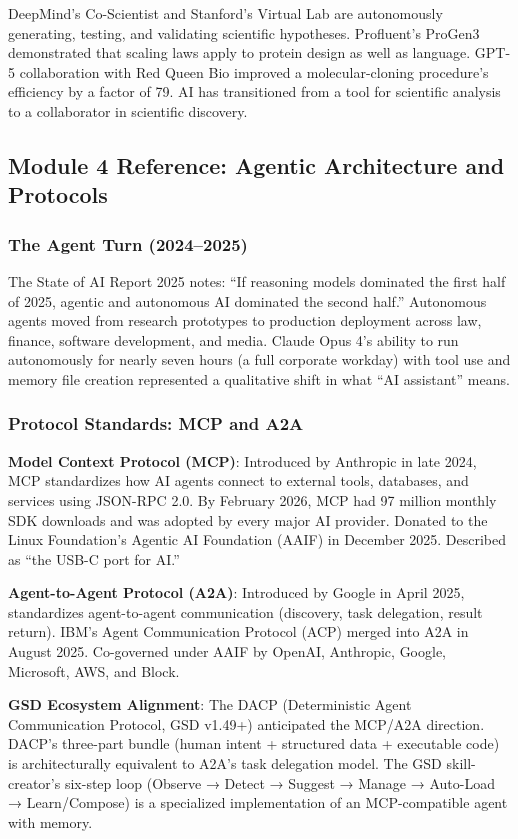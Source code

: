 \documentclass[11pt,letterpaper]{article}
\begin{document}
DeepMind's Co-Scientist and Stanford's Virtual Lab are autonomously generating, testing, and validating scientific hypotheses. Profluent's ProGen3 demonstrated that scaling laws apply to protein design as well as language. GPT-5 collaboration with Red Queen Bio improved a molecular-cloning procedure's efficiency by a factor of 79. AI has transitioned from a tool for scientific analysis to a collaborator in scientific discovery.

\subsection{Module 4 Reference: Agentic Architecture and Protocols}

\subsubsection{The Agent Turn (2024--2025)}

The State of AI Report 2025 notes: ``If reasoning models dominated the first half of 2025, agentic and autonomous AI dominated the second half.'' Autonomous agents moved from research prototypes to production deployment across law, finance, software development, and media. Claude Opus 4's ability to run autonomously for nearly seven hours (a full corporate workday) with tool use and memory file creation represented a qualitative shift in what ``AI assistant'' means.

\subsubsection{Protocol Standards: MCP and A2A}

\textbf{Model Context Protocol (MCP)}: Introduced by Anthropic in late 2024, MCP standardizes how AI agents connect to external tools, databases, and services using JSON-RPC 2.0. By February 2026, MCP had 97 million monthly SDK downloads and was adopted by every major AI provider. Donated to the Linux Foundation's Agentic AI Foundation (AAIF) in December 2025. Described as ``the USB-C port for AI.''

\textbf{Agent-to-Agent Protocol (A2A)}: Introduced by Google in April 2025, standardizes agent-to-agent communication (discovery, task delegation, result return). IBM's Agent Communication Protocol (ACP) merged into A2A in August 2025. Co-governed under AAIF by OpenAI, Anthropic, Google, Microsoft, AWS, and Block.

\textbf{GSD Ecosystem Alignment}: The DACP (Deterministic Agent Communication Protocol, GSD v1.49+) anticipated the MCP/A2A direction. DACP's three-part bundle (human intent + structured data + executable code) is architecturally equivalent to A2A's task delegation model. The GSD skill-creator's six-step loop (Observe → Detect → Suggest → Manage → Auto-Load → Learn/Compose) is a specialized implementation of an MCP-compatible agent with memory.
\end{document}
